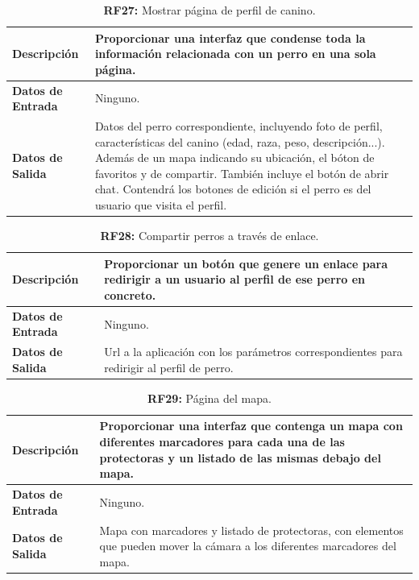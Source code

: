 \documentclass[a4paper, 12pt]{article}
\begin{document}
\begin{table}[H]
\captionsetup{justification=raggedright,singlelinecheck=false}
\caption{\textbf{RF27:} Mostrar página de perfil de canino.}
\label{tab:RF27}
	\begin{tabular}{|m{5cm}|m{10cm}|}
	\hline
	\textbf{Descripción} & Proporcionar una interfaz que condense toda la información relacionada con un perro en una sola página. \\ 
	\hline
	\textbf{Datos de Entrada} & Ninguno. \\ 
	\hline
	\textbf{Datos de Salida} & Datos del perro correspondiente, incluyendo foto de perfil, características del canino (edad, raza, peso, descripción...). Además de un mapa indicando su ubicación, el bóton de favoritos y de compartir. También incluye el botón de abrir chat. Contendrá los botones de edición si el perro es del usuario que visita el perfil. \\ 
	\hline
\end{tabular}
\end{table}

\begin{table}[H]
\captionsetup{justification=raggedright,singlelinecheck=false}
\caption{\textbf{RF28:} Compartir perros a través de enlace.}
\label{tab:RF28}
	\begin{tabular}{|m{5cm}|m{10cm}|}
	\hline
	\textbf{Descripción} & Proporcionar un botón que genere un enlace para redirigir a un usuario al perfil de ese perro en concreto. \\ 
	\hline
	\textbf{Datos de Entrada} & Ninguno. \\ 
	\hline
	\textbf{Datos de Salida} & Url a la aplicación con los parámetros correspondientes para redirigir al perfil de perro. \\ 
	\hline
\end{tabular}
\end{table}

\begin{table}[H]
\captionsetup{justification=raggedright,singlelinecheck=false}
\caption{\textbf{RF29:} Página del mapa.}
\label{tab:RF29}
	\begin{tabular}{|m{5cm}|m{10cm}|}
	\hline
	\textbf{Descripción} & Proporcionar una interfaz que contenga un mapa con diferentes marcadores para cada una de las protectoras y un listado de las mismas debajo del mapa. \\ 
	\hline
	\textbf{Datos de Entrada} & Ninguno. \\ 
	\hline
	\textbf{Datos de Salida} & Mapa con marcadores y listado de protectoras, con elementos que pueden mover la cámara a los diferentes marcadores del mapa. \\ 
	\hline
\end{tabular}
\end{table}
\end{document}
